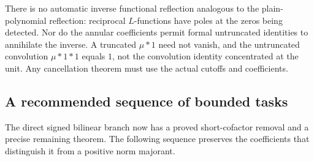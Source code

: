 \documentclass[11pt]{article}
\theoremstyle{definition}
\begin{document}
There is no automatic inverse functional reflection analogous to the plain-polynomial reflection: reciprocal $L$-functions have poles at the zeros being detected. Nor do the annular coefficients permit formal untruncated identities to annihilate the inverse. A truncated $\mu*1$ need not vanish, and the untruncated convolution $\mu*1*1$ equals $1$, not the convolution identity concentrated at the unit. Any cancellation theorem must use the actual cutoffs and coefficients.

\subsection{A recommended sequence of bounded tasks}
The direct signed bilinear branch now has a proved short-cofactor removal
and a precise remaining theorem. The following sequence preserves the
coefficients that distinguish it from a positive norm majorant.
\end{document}

